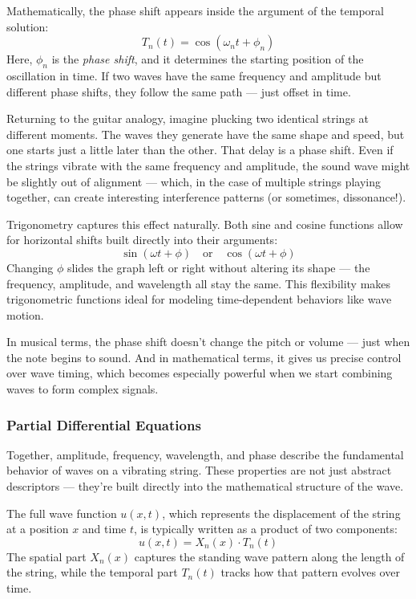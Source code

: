 Mathematically, the phase shift appears inside the argument of the temporal solution:
\[
T_n(t) = \cos(\omega_n t + \phi_n)
\]
Here, \( \phi_n \) is the \textit{phase shift}, and it determines the starting position of the oscillation in time. If two waves have the same frequency and amplitude but different phase shifts, they follow the same path — just offset in time. 

Returning to the guitar analogy, imagine plucking two identical strings at different moments. The waves they generate have the same shape and speed, but one starts just a little later than the other. That delay is a phase shift. Even if the strings vibrate with the same frequency and amplitude, the sound wave might be slightly out of alignment — which, in the case of multiple strings playing together, can create interesting interference patterns (or sometimes, dissonance!).

Trigonometry captures this effect naturally. Both sine and cosine functions allow for horizontal shifts built directly into their arguments:
\[
\sin(\omega t + \phi) \quad \text{or} \quad \cos(\omega t + \phi)
\]
Changing \( \phi \) slides the graph left or right without altering its shape — the frequency, amplitude, and wavelength all stay the same. This flexibility makes trigonometric functions ideal for modeling time-dependent behaviors like wave motion.

In musical terms, the phase shift doesn’t change the pitch or volume — just when the note begins to sound. And in mathematical terms, it gives us precise control over wave timing, which becomes especially powerful when we start combining waves to form complex signals.

\subsubsection{Partial Differential Equations}

Together, amplitude, frequency, wavelength, and phase describe the fundamental behavior of waves on a vibrating string. These properties are not just abstract descriptors — they’re built directly into the mathematical structure of the wave.

The full wave function \( u(x, t) \), which represents the displacement of the string at a position \( x \) and time \( t \), is typically written as a product of two components:
\[
u(x, t) = X_n(x) \cdot T_n(t)
\]
The spatial part \( X_n(x) \) captures the standing wave pattern along the length of the string, while the temporal part \( T_n(t) \) tracks how that pattern evolves over time.

